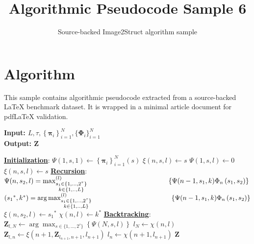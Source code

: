 \documentclass[11pt]{article}
\title{Algorithmic Pseudocode Sample 6}
\author{Source-backed Image2Struct algorithm sample}
\date{}
\begin{document}
\maketitle
\section{Algorithm}
This sample contains algorithmic pseudocode extracted from a source-backed LaTeX benchmark dataset. It is wrapped in a minimal article document for pdfLaTeX validation.

\begin{algorithm}[htbp]
\caption{Source-backed algorithmic procedure}
\begin{algorithm}
\caption{List Viterbi Algorithm \cite{seshadri1994list}}\hspace*{\algorithmicindent} \textbf{Input: $L, \tau, \left\{\mathbf{\pi}_i\right\}_{i=1}^N, \{\mathbf{\Phi}_i \}_{i=1}^N$} \\
\hspace*{\algorithmicindent} \textbf{Output: ${\mathbf{Z}}$}
\begin{algorithmic}[1]
\Statex \textbf{\underline{Initialization}}:
\State $\Psi(1,s,1) \gets \left\{\mathbf{\pi}_i\right\}_{i=1}^N\left(s\right)$  \State $\xi\left(n,s,l\right) \gets s$  
\State $\Psi(1,s,l) \gets 0$
\State $\xi\left(n,s,l\right) \gets s$
\EndFor
\EndFor
\Statex \textbf{\underline{Recursion}}:
\State {}
\State $\Psi(n,s_2,l) = \max^{(l)}_{{\substack{s_1\in\{1,...,2^{\tau}\} \\ k\in\{1,..,L\}}}}
\newline \hspace*{11.5em}
\left\{ \Psi(n-1,s_1,k) \Phi_n \left( s_1,s_2\right)\right\}$ \State $\left({s_1}^*, k^*\right) = \arg\max^{(l)}_{{\substack{s_1\in\{1,...,2^{\tau}\} \\ k\in\{1,..,L\}}}} \newline \hspace*{11.5em}
\left\{ \Psi(n-1, s_1,k) \Phi_n \left( s_1,s_2\right)\right\}$
\State $\xi\left(n,s_2,l\right) \gets {s_1}^*$ \State $\chi\left(n,l\right) \gets k^*$ \EndFor
\EndFor
\EndFor
\Statex \textbf{\underline{Backtracking}}:
\State $\mathbf{Z}_{l,N} \gets \arg\max_{s\in\{1,...,2^{\tau}\}}\left\{ \Psi(N,s,l)\right\}$ \State $l_N \gets \chi\left(n,l\right)$
\State $\mathbf{Z}_{l,n} \gets \xi\left(n+1,\mathbf{Z}_{l_{n+1},n+1},l_{n+1}\right)$ \State $l_{n} \gets \chi\left(n+1,l_{n+1}\right) $
\EndFor
\EndFor
\State \Return $\mathbf{Z}$
\end{algorithmic}
\end{algorithm}
\end{algorithm}
\end{document}
